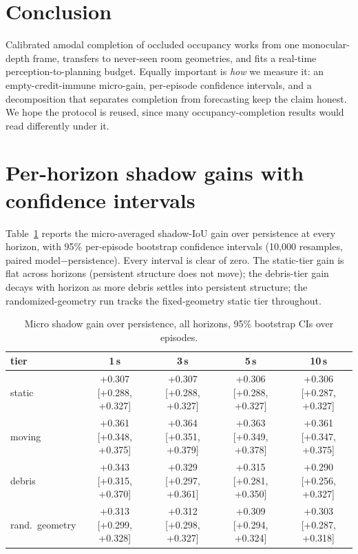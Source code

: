 \documentclass{article}
\begin{document}
\section{Conclusion}
\label{sec:conclusion}

Calibrated amodal completion of occluded occupancy works from one monocular-depth frame,
transfers to never-seen room geometries, and fits a real-time perception-to-planning budget.
Equally important is \emph{how} we measure it:
an empty-credit-immune micro-gain, per-episode confidence intervals, and a decomposition that
separates completion from forecasting keep the claim honest. We hope the protocol is reused,
since many occupancy-completion results would read differently under it.

\renewcommand{\bibfont}{\small}



\appendix

\section{Per-horizon shadow gains with confidence intervals}
\label{app:gains}

Table~\ref{tab:gains-full} reports the micro-averaged shadow-IoU gain over persistence at every
horizon, with 95\% per-episode bootstrap confidence intervals (10{,}000 resamples, paired
model$-$persistence). Every interval is clear of zero. The static-tier gain is flat across
horizons (persistent structure does not move); the debris-tier gain decays with horizon as more
debris settles into persistent structure; the randomized-geometry run tracks the fixed-geometry
static tier throughout.

\begin{table}[ht]
  \centering
  \scriptsize
  \setlength{\tabcolsep}{3.5pt}
  \caption{Micro shadow gain over persistence, all horizons, 95\% bootstrap CIs over episodes.}
  \label{tab:gains-full}
  \begin{tabular}{lcccc}
    \toprule
    tier & 1\,s & 3\,s & 5\,s & 10\,s \\
    \midrule
    static & +0.307 [+0.288, +0.327] & +0.307 [+0.288, +0.327] & +0.306 [+0.288, +0.327] & +0.306 [+0.287, +0.327] \\
    moving & +0.361 [+0.348, +0.375] & +0.364 [+0.351, +0.379] & +0.363 [+0.349, +0.378] & +0.361 [+0.347, +0.375] \\
    debris & +0.343 [+0.315, +0.370] & +0.329 [+0.297, +0.361] & +0.315 [+0.281, +0.350] & +0.290 [+0.256, +0.327] \\
    rand.\ geometry & +0.313 [+0.299, +0.328] & +0.312 [+0.298, +0.327] & +0.309 [+0.294, +0.324] & +0.303 [+0.287, +0.318] \\
    \bottomrule
  \end{tabular}
\end{table}
\end{document}
